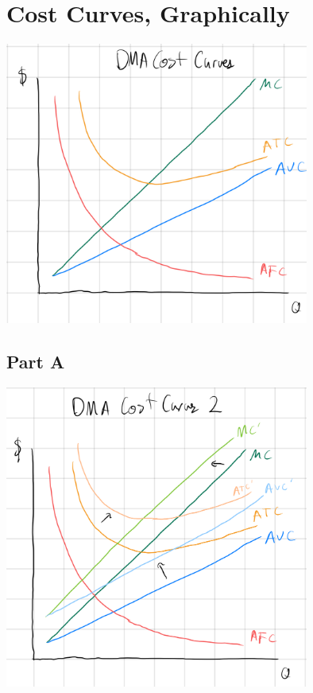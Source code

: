 \documentclass[8pt]{extarticle}
\begin{document}
{\section{Cost Curves, Graphically}
\label{sec:Cost Curves, Graphically}
\begin{center}
	\includegraphics[width=10cm]{HW7Q4}
\end{center}
\subsection*{Part A}
\begin{center}
	\includegraphics[width=10cm]{HW7Q4A}
\end{center}
}
\end{document}
